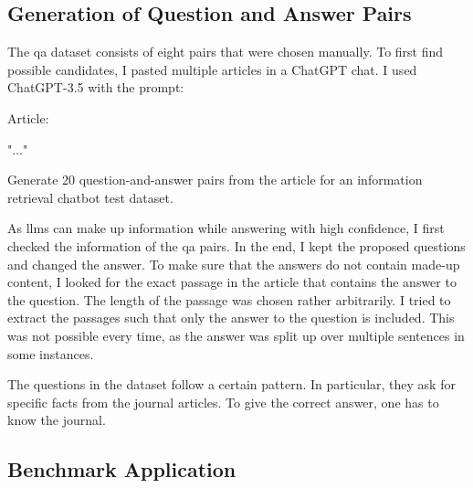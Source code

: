 \documentclass[../main.tex]{subfiles}
\begin{document}
\subsection{Generation of Question and Answer Pairs}

The \gls{qa} dataset consists of eight pairs that were chosen manually.
To first find possible candidates, I pasted multiple articles in
a ChatGPT chat.
I used ChatGPT-3.5 with the prompt:
\begin{Code}
    Article:

    "..."

    Generate 20 question-and-answer pairs from the article
    for an information retrieval chatbot test dataset.
\end{Code}
As \glspl{llm} can make up information while answering with high confidence,
I first checked the information of the \gls{qa} pairs.
In the end, I kept the proposed questions and changed the answer.
To make sure that the answers do not contain made-up content, I looked for
the exact passage in the article that contains the answer to the question.
The length of the passage was chosen rather arbitrarily.
I tried to extract the passages such that only the answer to the question
is included.
This was not possible every time, as the answer was split up over multiple
sentences in some instances.

The questions in the dataset follow a certain pattern.
In particular, they ask for specific facts from the journal articles.
To give the correct answer, one has to know the journal.


\subsection{Benchmark Application}
\end{document}
